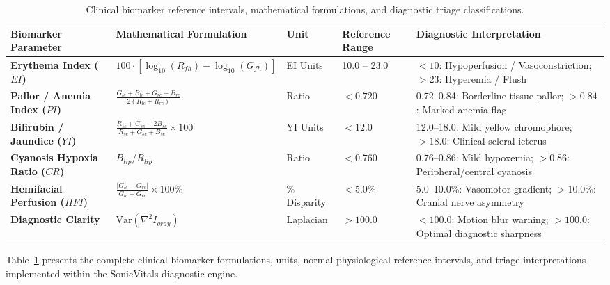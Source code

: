 \documentclass[journal]{IEEEtran}
\begin{document}
\begin{table}[!t]
    \centering
    \caption{Clinical biomarker reference intervals, mathematical formulations, and diagnostic triage classifications.}
    \label{tab:clinical_biomarkers}
    \footnotesize
    \renewcommand{\arraystretch}{1.12}
    \setlength{\tabcolsep}{3.5pt}
    \begin{tabular}{p{3.2cm} p{3.8cm} p{1.6cm} p{2.2cm} p{6.4cm}}
        \toprule
        \textbf{Biomarker Parameter} & \textbf{Mathematical Formulation} & \textbf{Unit} & \textbf{Reference Range} & \textbf{Diagnostic Interpretation} \\
        \midrule
        \textbf{Erythema Index ($EI$)} & $100 \cdot [\log_{10}(R_{fh}) - \log_{10}(G_{fh})]$ & EI Units & 10.0 -- 23.0 & $<10$: Hypoperfusion / Vasoconstriction; $>23$: Hyperemia / Flush \\
        \textbf{Pallor / Anemia Index ($PI$)} & $\frac{G_{lc} + B_{lc} + G_{rc} + B_{rc}}{2(R_{lc} + R_{rc})}$ & Ratio & $< 0.720$ & 0.72--0.84: Borderline tissue pallor; $>0.84$: Marked anemia flag \\
        \textbf{Bilirubin / Jaundice ($YI$)} & $\frac{R_{sc} + G_{sc} - 2 B_{sc}}{R_{sc} + G_{sc} + B_{sc}} \times 100$ & YI Units & $< 12.0$ & 12.0--18.0: Mild yellow chromophore; $>18.0$: Clinical scleral icterus \\
        \textbf{Cyanosis Hypoxia Ratio ($CR$)} & $B_{lip} / R_{lip}$ & Ratio & $< 0.760$ & 0.76--0.86: Mild hypoxemia; $>0.86$: Peripheral/central cyanosis \\
        \textbf{Hemifacial Perfusion ($HFI$)} & $\frac{|G_{lc} - G_{rc}|}{G_{lc} + G_{rc}} \times 100\%$ & \% Disparity & $< 5.0\%$ & 5.0--10.0\%: Vasomotor gradient; $>10.0\%$: Cranial nerve asymmetry \\
        \textbf{Diagnostic Clarity} & $\mathrm{Var}(\nabla^2 I_{gray})$ & Laplacian & $> 100.0$ & $<100.0$: Motion blur warning; $>100.0$: Optimal diagnostic sharpness \\
        \bottomrule
    \end{tabular}
\end{table}

Table~\ref{tab:clinical_biomarkers} presents the complete clinical biomarker formulations, units, normal physiological reference intervals, and triage interpretations implemented within the SonicVitals diagnostic engine.

\end{document}
